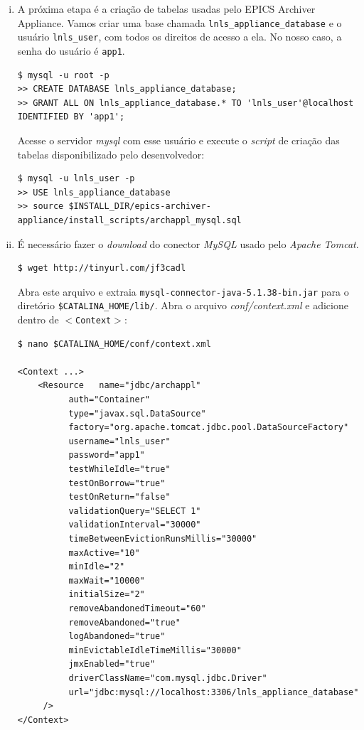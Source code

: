 \begin {enumerate}[i.]
\item \label{mysql-install}A próxima etapa é a criação de tabelas usadas pelo
EPICS Archiver Appliance. Vamos criar uma base chamada \texttt{lnls\_appliance\_database} e o
usuário \texttt{lnls\_user}, com todos os direitos de acesso a ela. No nosso
caso, a senha do usuário é \texttt{app1}. 

\begin{lstlisting}[basicstyle=\fontsize{9}{13}\selectfont\ttfamily,keywordstyle=\ttfamily,
style=nonumbers] 
$ mysql -u root -p
>> CREATE DATABASE lnls_appliance_database;
>> GRANT ALL ON lnls_appliance_database.* TO 'lnls_user'@localhost IDENTIFIED BY 'app1';
\end{lstlisting}

Acesse o servidor \textit{mysql} com esse usuário e execute o \textit{script}
de criação das tabelas disponibilizado pelo desenvolvedor:

\begin{lstlisting}[basicstyle=\fontsize{9}{13}\selectfont\ttfamily,keywordstyle=\ttfamily,
style=nonumbers] 
$ mysql -u lnls_user -p
>> USE lnls_appliance_database
>> source $INSTALL_DIR/epics-archiver-appliance/install_scripts/archappl_mysql.sql
\end{lstlisting}

\item É necessário fazer o \textit{download} do conector \textit{MySQL} usado
pelo \textit{Apache Tomcat}.

\begin{lstlisting}[keywordstyle=\ttfamily, style=nonumbers]
$ wget http://tinyurl.com/jf3cadl
\end{lstlisting} 

Abra este arquivo e extraia \texttt{mysql-connector-java-5.1.38-bin.jar} para o
diretório \texttt{\$CATALINA\_HOME/lib/}. Abra o arquivo
\textit{conf/context.xml} e adicione dentro de \texttt{\(<\)Context\(>\)}:

\begin{lstlisting}[keywordstyle=\ttfamily, style=nonumbers]
$ nano $CATALINA_HOME/conf/context.xml

<Context ...>
	<Resource   name="jdbc/archappl"
	      auth="Container"
	      type="javax.sql.DataSource"
	      factory="org.apache.tomcat.jdbc.pool.DataSourceFactory"
	      username="lnls_user"
	      password="app1" 
	      testWhileIdle="true"
	      testOnBorrow="true"
	      testOnReturn="false"
	      validationQuery="SELECT 1"
	      validationInterval="30000"
	      timeBetweenEvictionRunsMillis="30000"
	      maxActive="10" 
	      minIdle="2" 
	      maxWait="10000" 
	      initialSize="2"
	      removeAbandonedTimeout="60"
	      removeAbandoned="true"
	      logAbandoned="true"
	      minEvictableIdleTimeMillis="30000" 
	      jmxEnabled="true"
	      driverClassName="com.mysql.jdbc.Driver"
	      url="jdbc:mysql://localhost:3306/lnls_appliance_database"
	 />
</Context>
\end{lstlisting}


\end{enumerate}
